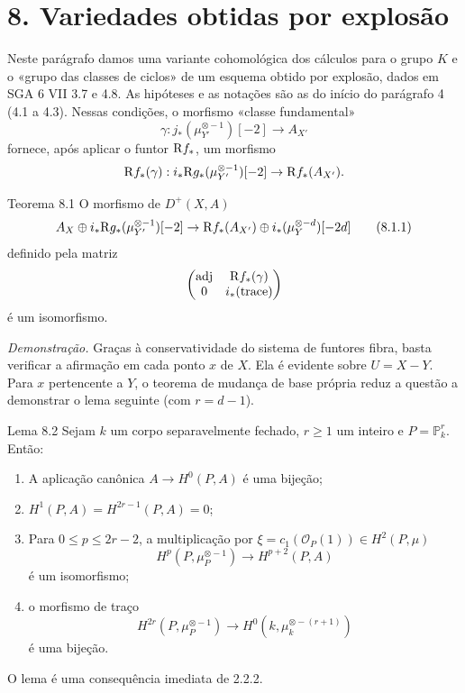 \section*{8. Variedades obtidas por explosão}

Neste parágrafo damos uma variante cohomológica dos cálculos para o grupo $K$ e o «grupo das classes de ciclos» de um esquema obtido por explosão, dados em SGA 6 VII 3.7 e 4.8. As hipóteses e as notações são as do início do parágrafo 4 (4.1 a 4.3). Nessas condições, o morfismo «classe fundamental»
\[
\gamma:j_*(\mu_{Y'}^{\otimes -1})[-2]\to A_{X'}
\]
fornece, após aplicar o funtor $\mathrm{R} f_*$, um morfismo
\[
\mathrm{R} f_*(\gamma):i_*\mathrm{R} g_*(\mu_{Y'}^{\otimes -1})[-2]\to \mathrm{R} f_*(A_{X'}).
\]

\begin{statement}{Teorema 8.1}
O morfismo de $D^+(X,A)$
\[
A_X\oplus i_*\mathrm{R} g_*(\mu_{Y'}^{\otimes -1})[-2]\to
\mathrm{R} f_*(A_{X'})\oplus i_*(\mu_Y^{\otimes -d})[-2d]
\tag{8.1.1}
\]
definido pela matriz
\[
\begin{pmatrix}
\operatorname{adj}&\mathrm{R} f_*(\gamma)\\
0&i_*(\operatorname{trace})
\end{pmatrix}
\]
é um isomorfismo.
\end{statement}

\emph{Demonstração.} Graças à conservatividade do sistema de funtores fibra, basta verificar a afirmação em cada ponto $x$ de $X$. Ela é evidente sobre $U=X-Y$. Para $x$ pertencente a $Y$, o teorema de mudança de base própria reduz a questão a demonstrar o lema seguinte (com $r=d-1$).

\begin{statement}{Lema 8.2}
Sejam $k$ um corpo separavelmente fechado, $r\ge1$ um inteiro e $P=\mathbb P_k^r$. Então:
\begin{enumerate}[label=\alph*)]
\item A aplicação canônica $A\to H^0(P,A)$ é uma bijeção;
\item $H^1(P,A)=H^{2r-1}(P,A)=0$;
\item Para $0\le p\le2r-2$, a multiplicação por $\xi=c_1(\mathcal O_P(1))\in H^2(P,\mu)$
\[
H^p(P,\mu_P^{\otimes -1})\to H^{p+2}(P,A)
\]
é um isomorfismo;
\item o morfismo de traço
\[
H^{2r}(P,\mu_P^{\otimes -1})\to H^0(k,\mu_k^{\otimes -(r+1)})
\]
é uma bijeção.
\end{enumerate}
\end{statement}

O lema é uma consequência imediata de 2.2.2.
